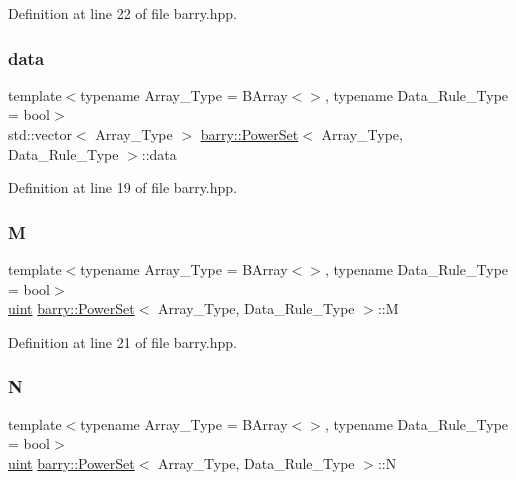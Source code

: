 Definition at line 22 of file barry.\+hpp.

\mbox{\label{classbarry_1_1_power_set_a90fecd17a9d1f36153c07bc929b1630f}} 
\subsubsection{\texorpdfstring{data}{data}}
{\footnotesize\ttfamily template$<$typename Array\+\_\+\+Type  = B\+Array$<$$>$, typename Data\+\_\+\+Rule\+\_\+\+Type  = bool$>$ \\
std\+::vector$<$ Array\+\_\+\+Type $>$ \hyperlink{classbarry_1_1_power_set}{barry\+::\+Power\+Set}$<$ Array\+\_\+\+Type, Data\+\_\+\+Rule\+\_\+\+Type $>$\+::data}



Definition at line 19 of file barry.\+hpp.

\mbox{\label{classbarry_1_1_power_set_ae64182a21f9969a2c9fdf73ab23a6c5e}} 
\subsubsection{\texorpdfstring{M}{M}}
{\footnotesize\ttfamily template$<$typename Array\+\_\+\+Type  = B\+Array$<$$>$, typename Data\+\_\+\+Rule\+\_\+\+Type  = bool$>$ \\
\hyperlink{namespacebarry_a11dfc53ddb4672278319aa04f1e09a6c}{uint} \hyperlink{classbarry_1_1_power_set}{barry\+::\+Power\+Set}$<$ Array\+\_\+\+Type, Data\+\_\+\+Rule\+\_\+\+Type $>$\+::M}



Definition at line 21 of file barry.\+hpp.

\mbox{\label{classbarry_1_1_power_set_adea0f6434b17b3fc391475a11db00c2f}} 
\subsubsection{\texorpdfstring{N}{N}}
{\footnotesize\ttfamily template$<$typename Array\+\_\+\+Type  = B\+Array$<$$>$, typename Data\+\_\+\+Rule\+\_\+\+Type  = bool$>$ \\
\hyperlink{namespacebarry_a11dfc53ddb4672278319aa04f1e09a6c}{uint} \hyperlink{classbarry_1_1_power_set}{barry\+::\+Power\+Set}$<$ Array\+\_\+\+Type, Data\+\_\+\+Rule\+\_\+\+Type $>$\+::N}



